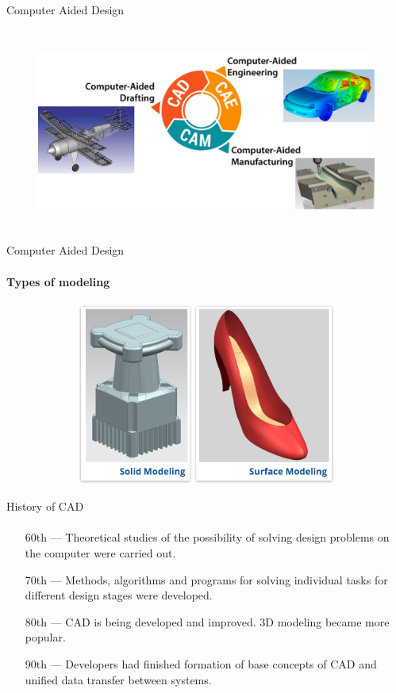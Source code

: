 \documentclass[aspectratio=169]{beamer}
\begin{document}
\begin{frame}[t]{Computer Aided Design}
\framesubtitle{}
    \vspace{-0.6cm}
    \begin{figure}[H]
        \centering\includegraphics[height=6.5cm,width=1\textwidth,keepaspectratio]{resources/CADCAMCAE.png}
        \label{fig:resources/CADCAMCAE.png}
    \end{figure}
\end{frame}

\begin{frame}[t]{Computer Aided Design}
\framesubtitle{Types of modeling}
    \vspace{-0.6cm}
    \begin{figure}[H]
        \centering\includegraphics[height=6cm,width=1\textwidth,keepaspectratio]{resources/solidsurface.png}
        \label{fig:resources/solidsurface.png}
    \end{figure}
\end{frame}

\begin{frame}[t]{History of CAD}
\framesubtitle{}
    \begin{itemize}
        \item[60th] --- Theoretical studies of the possibility of solving design problems on the computer were carried out.
        \item[70th] --- Methods, algorithms and programs for solving individual tasks for different design stages were developed.
        \item[80th] --- CAD is being developed and improved. 3D modeling became more popular.
        \item[90th] --- Developers had finished formation of base concepts of CAD and unified data transfer between systems.
    \end{itemize}
\end{frame}
\end{document}
